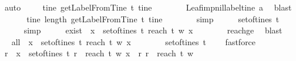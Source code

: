 \begin{isabellebody}
\ auto\isanewline
\ \ \isamarkupfalse%
\ {\isachardoublequoteopen}{\isasymforall}\ tine{\isachardot}\ getLabelFromTine\ t\ tine\ {\isacharequal}\ {\isacharbrackleft}{\isacharbrackright}{\isachardoublequoteclose}\isanewline
\ \ \ \ \isamarkupfalse%
\ Leaf{\isacharunderscore}imp{\isacharunderscore}nil{\isacharunderscore}label{\isacharunderscore}tine\ a\ \isamarkupfalse%
\ blast\ \isanewline
\ \ \isamarkupfalse%
\ \isamarkupfalse%
\ {\isachardoublequoteopen}{\isasymforall}\ tine{\isachardot}\ length\ {\isacharparenleft}getLabelFromTine\ t\ tine{\isacharparenright}\ {\isacharequal}\ {}{\isachardoublequoteclose}\isanewline
\ \ \ \ \isamarkupfalse%
\ simp\isanewline
\ \ \isamarkupfalse%
\ \isamarkupfalse%
\ {\isachardoublequoteopen}set{\isacharunderscore}of{\isacharunderscore}tines\ t\ {\isacharequal}\ {\isacharbraceleft}{\isacharbrackleft}{\isacharbrackright}{\isacharbraceright}{\isachardoublequoteclose}\isanewline
\ \ \ \ \isamarkupfalse%
\ simp\isanewline
\ \ \isamarkupfalse%
\ \isamarkupfalse%
\ exist{\isacharcolon}\ {\isachardoublequoteopen}{\isasymexists}\ x\ {\isasymin}\ set{\isacharunderscore}of{\isacharunderscore}tines\ t{\isachardot}\ reach\ t\ w\ x\ {\isasymge}\ {}{\isachardoublequoteclose}\isanewline
\ \ \ \ \isamarkupfalse%
\ reachge{}\ \isamarkupfalse%
\ blast\isanewline
\ \ \isamarkupfalse%
\ \isamarkupfalse%
\ all{\isacharcolon}\ {\isachardoublequoteopen}{\isasymforall}\ x\ {\isasymin}\ set{\isacharunderscore}of{\isacharunderscore}tines\ t{\isachardot}\ reach\ t\ w\ x\ {\isasymge}\ {}{\isachardoublequoteclose}\isanewline
\ \ \ \ \isamarkupfalse%
\ {\isacartoucheopen}set{\isacharunderscore}of{\isacharunderscore}tines\ t\ {\isacharequal}\ {\isacharbraceleft}{\isacharbrackleft}{\isacharbrackright}{\isacharbraceright}{\isacartoucheclose}\ \isamarkupfalse%
\ fastforce\isanewline
\ \ \isamarkupfalse%
\ \isamarkupfalse%
\ {\isachardoublequoteopen}{\isacharbraceleft}r{\isachardot}\ {\isasymexists}\ x\ {\isasymin}\ set{\isacharunderscore}of{\isacharunderscore}tines\ t{\isachardot}\ r\ {\isacharequal}\ reach\ t\ w\ x{\isacharbraceright}\ {\isacharequal}\ {\isacharbraceleft}r{\isachardot}\ r\ {\isacharequal}\ reach\ t\ w\ {\isacharbrackleft}{\isacharbrackright}{\isacharbraceright}{\isachardoublequoteclose}\isanewline

\end{isabellebody}

